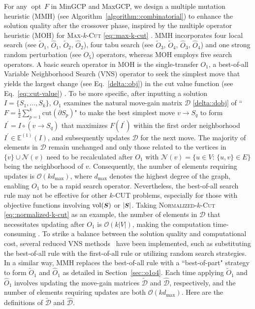 \documentclass[12pt, a4paper]{article}%
\DeclareMathOperator*{\opt}{\ensuremath{opt}}
\renewcommand{\vec}[1]{\mbox{\boldmath \small $#1$}}
\newcommand{\cut}{\mathrm{cut}}
\newcommand{\vol}{\mathrm{vol}}
\numberwithin{equation}{section}
\theoremstyle{plain}
\begin{document}
For any $\opt\,F$ in MinGCP and MaxGCP, we design a multiple mutation heuristic (MMH)  (see Algorithm~\ref{algorithm::combinatorial}) to enhance the solution quality after the crossover phase,
inspired by the multiple operator heuristic (MOH) for \textsc{Max}-$k$-\textsc{Cut} \eqref{eq::max-k-cut} \cite{Ma2015}. 
MMH incorporates four local search (see $\widetilde{O}_1$, $\widehat{O}_1$, $\widetilde{O}_2$, $\widehat{O}_2$),   
four tabu search (see $\widetilde{O}_3$, $\widetilde{O}_4$, $\widehat{O}_3$, $\widehat{O}_4$) and one strong random perturbation (see $O_5$) operators, whereas MOH employs five search operators. 
A basic search operator in MOH is the single-transfer $O_1$, 
a best-of-all Variable Neighborhood Search (VNS) operator to seek the simplest move that yields the largest change (see Eq.~\eqref{delta::obj}) in the cut value function (see Eq.~\eqref{eq::cut-value}) \cite{mladenovic1997variable,hansen2002developments}.
To be more specific, 
after inputting a solution $I=\{S_1,\ldots,S_k\}$, 
$O_1$ examines the natural move-gain matrix $\mathcal{D}$ \eqref{delta::dobj} of ``$F=\frac{1}{2}\sum_{p=1}^k\cut(\partial S_p)$" to make the best simplest move $v\rightarrow S_q$ to form $I^\prime= I\circ (v\rightarrow S_q)$ that maximizes $F(I^\prime)$ within the first order neighborhood $I^\prime\in\mathbb{E}^{(1)}(I)$, and subsequently updates $\mathcal{D}$ for the next move. The majority of elements in $\mathcal{D}$ remain unchanged and only those related to the vertices in $\{v\}\cup\mathcal{N}(v)$ need to be recalculated after $O_1$ with $\mathcal{N}(v)=\{u\in V:\,\{u,v\}\in E\}$ being the neighborhood of $v$. Consequently, the number of elements requiring updates is $\mathcal{O}(kd_{\max})$, where $d_{\max}$ denotes the highest degree of the graph, enabling $O_1$ to be a rapid search operator. Nevertheless, the best-of-all search rule may not be effective for other $k$-CUT problems, especially for those with objective functions involving $\vol(\vec S)$ or $|\vec S|$.  Taking \textsc{Normalized}-$k$-\textsc{Cut} \eqref{eq::normalized-k-cut} as an example, the number of elements in $\mathcal{D}$ that necessitates updating after $O_1$ is $\mathcal{O}(k|V|)$, making the computation time-consuming \cite{hansen2012vns}. To strike a balance between the solution quality and computational cost, 
several reduced VNS methods~\cite{hansen2001variable,hansen2002developments,hansen2012vns,Ma2015} have been implemented, such as substituting the best-of-all rule with the first-of-all rule or utilizing random search strategies.
In a similar way, MMH replaces the best-of-all rule with a ``best-of-part" strategy to form $\widetilde{O}_1$ and $\widehat{O}_1$ as detailed in Section~\ref{sec::o1o4}. Each time applying $\widetilde{O}_1$ and $\widehat{O}_1$ involves updating the move-gain matrices $\widetilde{\mathcal{D}}$ and $\widehat{\mathcal{D}}$, respectively, and the number of elements requiring updates are both $\mathcal{O}(kd_{\max})$. Here are the definitions of $\widetilde{\mathcal{D}}$ and $\widehat{\mathcal{D}}$.
\end{document}
